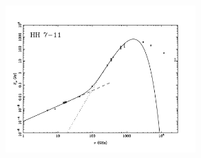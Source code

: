 \documentclass[9pt]{extarticle}   	%
\begin{document}
\begin{figure}[htbp]
\begin{center}
\includegraphics[width=0.65\textwidth]{plots/HH7-11.pdf}
\label{default}
\end{center}
\end{figure}

\clearpage
\end{document}

